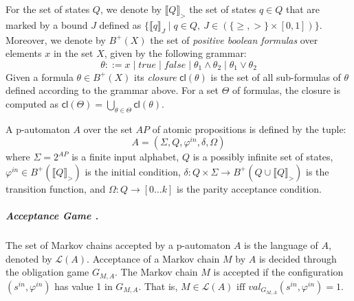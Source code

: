 \documentclass[a4paper,UKenglish]{oasics-v2016}
\begin{document}
For the set of states $Q$, we denote by $\llbracket Q \rrbracket_{>}$ the set 
of states $q \in Q$ that are marked by a bound $J$ defined as $\lbrace 
\llbracket q \rrbracket_{J} \mid q\!\in\!Q,\ J\!\in\!(\lbrace \geq,>\rbrace 
\times [0,1]) \rbrace$. Moreover, we denote by $B^{+}(X)$ the set of 
\emph{positive boolean formulas} over elements $x$ in the set $X$, given by the 
following grammar:
$$ \theta ::= x \mid true \mid false \mid \theta_{1}\wedge\theta_{2} \mid 
\theta_{1}\vee\theta_{2}$$ 
Given a formula $\theta \in B^{+}(X)$ its \emph{closure} $\textsf{cl}(\theta)$ 
is the set of all sub-formulas of $\theta$ defined according to the grammar 
above.
For a set $\Theta$ of formulas, the closure is computed as 
$\textsf{cl}(\Theta)=\bigcup_{\theta \in \Theta}\textsf{cl}(\theta)$.
\begin{definition}[p-Automata]
	A p-automaton $A$ over the set $AP$ of atomic propositions is defined by 
	the 
	tuple: 
	$$A = (\Sigma, Q, \varphi^{in}, \delta, \Omega)$$
	where $\Sigma=2^{AP}$ is a finite input alphabet, $Q$ is a possibly 
	infinite 
	set of states, $\varphi^{in}\in B^+(\llbracket Q\rrbracket_>)$ is the 
	initial 
	condition, $\delta:Q\times\Sigma\rightarrow B^+(Q \cup \llbracket 
	Q\rrbracket_>)$ is the transition function, and 
	$\Omega:Q\rightarrow[0\hdots 
	k]$ is the parity acceptance condition.
\end{definition}
%
%
\subparagraph{Acceptance Game \cite{CP13}.}The set of Markov chains accepted by 
a 
p-automaton $A$ is the language of $A$, denoted by $\mathcal{L}(A)$.
Acceptance of a Markov chain $M$ by $A$ is decided through the obligation game 
$G_{M,A}$. The Markov chain $M$ is accepted if the configuration 
$(s^{in},\varphi^{in})$ 
has value 1 in $G_{M,A}$. That is, $M\in\mathcal{L}(A)\mbox{ iff 
}val_{G_{M,A}}(s^{in}, \varphi^{in})=1$.
%
\end{document}
